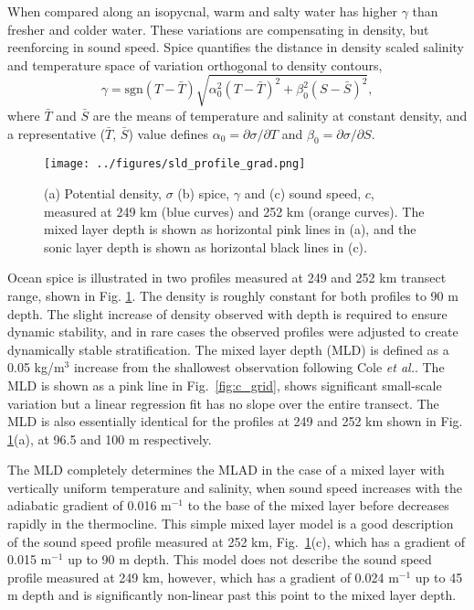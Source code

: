 \documentclass[preprint,NumberedRefs]{JASA}
\begin{document}
When compared along an isopycnal, warm and salty water has higher $\gamma$ than fresher and colder water. These variations are compensating in density, but reenforcing in sound speed. Spice quantifies the distance in density scaled salinity and temperature space of variation orthogonal to density contours,
\begin{equation}
    \gamma=\textrm{sgn}(T-\bar{T}) \sqrt{\alpha_0^2(T-\bar{T})^2 +\beta_0^2(S-\bar{S})^2},
    \label{eq:gamma}
\end{equation}
where $\bar{T}$ and $\bar{S}$ are the means of temperature and salinity at constant density, and a representative ($\bar{T}$, $\bar{S}$) value defines $\alpha_0=\partial \sigma / \partial T$ and $\beta_0=\partial \sigma / \partial S$.

\begin{figure}
\texttt{[image: ../figures/sld\_profile\_grad.png]}
    \caption{\label{fig:profiles}{(a) Potential density, $\sigma$ (b) spice, $\gamma$ and (c) sound speed, $c$, measured at 249 km (blue curves) and 252 km (orange curves). The mixed layer depth is shown as horizontal pink lines in (a), and the sonic layer depth is shown as horizontal black lines in (c).}}
\end{figure}
Ocean spice is illustrated in two profiles measured at 249 and 252 km transect range, shown in Fig. \ref{fig:profiles}. The density is roughly constant for both profiles to 90 m depth. The slight increase of density observed with depth is required to ensure dynamic stability, and in rare cases the observed profiles were adjusted to create dynamically stable stratification\citep{barker2017stabilizing}. The mixed layer depth (MLD) is defined as a 0.05 kg/m$^3$ increase from the shallowest observation following Cole \emph{et al.}\cite{cole2010seasonal}. The MLD is shown as a pink line in Fig.~\ref{fig:c_grid}, shows significant small-scale variation but a linear regression fit has no slope over the entire transect. The MLD is also essentially identical for the profiles at 249 and 252 km shown in Fig. \ref{fig:profiles}(a), at 96.5 and 100 m respectively.

The MLD completely determines the MLAD in the case of a mixed layer with vertically uniform temperature and salinity, when sound speed increases with the adiabatic gradient of 0.016 m$^{-1}$ to the base of the mixed layer before decreases rapidly in the thermocline. This simple mixed layer model is a good description of the sound speed profile measured at 252 km, Fig.~\ref{fig:profiles}(c), which has a gradient of 0.015 m$^{-1}$ up to 90 m depth. This model does not describe the sound speed profile measured at 249 km, however, which has a gradient of 0.024 m$^{-1}$ up to 45 m depth and is significantly non-linear past this point to the mixed layer depth.
\end{document}
